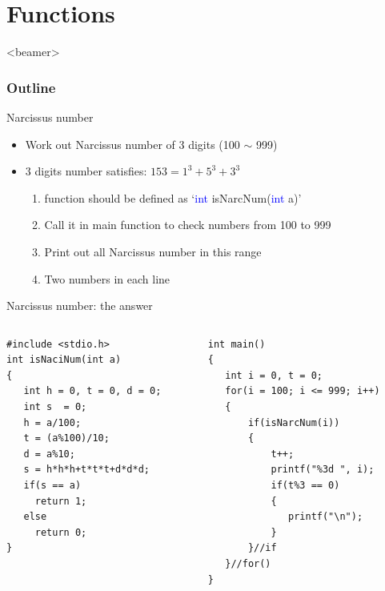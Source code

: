 \section{Functions}
\label{sec:func}
\begin{frame}<beamer>
    \frametitle{Outline}
    \tableofcontents[currentsection]
\end{frame}

\begin{frame}{Narcissus number}
\begin{itemize}
	\item {Work out Narcissus number of 3 digits (100 $\sim$ 999)}
	\item {3 digits number satisfies: $153=1^3+5^3+3^3$}
	\begin{enumerate}
		\item {function should be defined as `\textcolor{blue}{int} isNarcNum(\textcolor{blue}{int} a)'}
		\item {Call it in main function to check numbers from 100 to 999}
		\item {Print out all Narcissus number in this range}
		\item {Two numbers in each line}
	\end{enumerate}
\end{itemize}
\end{frame}

\ifx\answer{}
\begin{frame}[fragile]{Narcissus number: the answer}
\begin{columns}
\begin{column}{0.5\linewidth}
\begin{lstlisting}[linewidth=0.95\linewidth, xleftmargin=0.05\linewidth]
#include <stdio.h>
int isNaciNum(int a)
{
   int h = 0, t = 0, d = 0;
   int s  = 0;
   h = a/100;
   t = (a%100)/10;
   d = a%10;
   s = h*h*h+t*t*t+d*d*d;
   if(s == a)
     return 1;
   else 
     return 0;
}
\end{lstlisting}
\end{column}
\begin{column}{0.5\linewidth}
\begin{lstlisting}[firstnumber=15]
int main()
{
   int i = 0, t = 0;
   for(i = 100; i <= 999; i++)
   {
       if(isNarcNum(i))
       {
           t++;
           printf("%3d ", i);
           if(t%3 == 0)
           {
              printf("\n");
           }
       }//if
   }//for()
}
\end{lstlisting}
\end{column}
\end{columns}
\end{frame}
\fi


